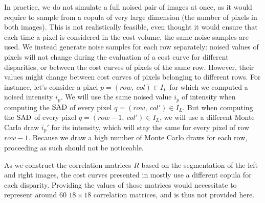 In practice, we do not simulate a full noised pair of images at once, as it would require to sample from a copula of very large dimension (the number of pixels in both images). This is not realistically feasible, even thought it would ensure that each time a pixel is considered in the cost volume, the same noise samples are used. We instead generate noise samples for each row separately: noised values of pixels will not change during the evaluation of a cost curve for different disparities, or between the cost curves of pixels of the same row. However, their values might change between cost curves of pixels belonging to different rows. For instance, let's consider a pixel $p=(row,~col)\in I_L$ for which we computed a noised intensity $i_p$. We will use the same noised value $i_p$ of intensity when computing the $\mathrm{SAD}$ of every pixel $q=(row,~col')\in I_L$. But when computing the $\mathrm{SAD}$ of every pixel $q=(row-1,~col')\in I_L$, we will use a different Monte Carlo draw $i_p'$ for its intensity, which will stay the same for every pixel of row $row-1$. Because we draw a high number of Monte Carlo draws for each row, proceeding as such should not be noticeable. 

\begin{remark}
    As we construct the correlation matrices $R$ based on the segmentation of the left and right images, the cost curves presented in  mostly use a different copula for each disparity. Providing the values of those matrices would necessitate to represent around $60$ $18\times18$ correlation matrices, and is thus not provided here.
\end{remark}

